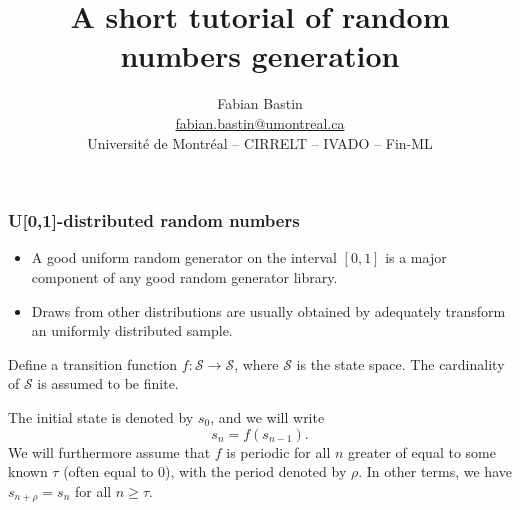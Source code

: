 \documentclass{beamer}
\title[Random Numbers Generation]{A short tutorial of random numbers generation}
\author[Fabian Bastin]{Fabian Bastin \\ \url{fabian.bastin@umontreal.ca} \\ Université de Montréal -- CIRRELT -- IVADO -- Fin-ML}
\date{}
\begin{document}
	
	\frame{\titlepage}
	
	
	\begin{frame}
		\frametitle{U[0,1]-distributed random numbers}
		
		\begin{itemize}
			\item
			A good uniform random generator on the interval $[0,1]$ is a major
			component of any good random generator library.
			\item
			Draws from other distributions are usually obtained by adequately transform an
			uniformly distributed sample.
		\end{itemize}
		
		\mbox{}
		
		Define a {\blue transition function} $f: \mathcal{S} \rightarrow \mathcal{S}$,
		where $\mathcal{S}$ is the {\blue state space}.
		The cardinality of $\mathcal{S}$ is assumed to be finite.
		
		\mbox{}
		
		The initial state is denoted by $s_0$, and we will write
		\[
		s_n = f(s_{n-1}).
		\]
		We will furthermore assume that $f$ is periodic for all $n$ greater of
		equal to some known $\tau$ (often equal to 0), with the period denoted
		by $\rho$.
		In other terms, we have $s_{n+\rho} = s_n$ for all $n\ge\tau$.
		
	\end{frame}
	
\end{document}
